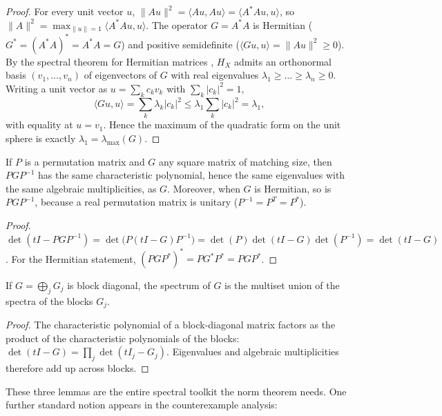 \begin{proof}
For every unit vector $u$,
$\lVert Au\rVert^2=\langle Au,Au\rangle=\langle A^*Au,u\rangle$, so
$\lVert A\rVert^2=\max_{\lVert u\rVert=1}\langle A^*Au,u\rangle$. The
operator $G=A^*A$ is Hermitian ($G^*=(A^*A)^*=A^*A=G$) and positive
semidefinite ($\langle Gu,u\rangle=\lVert Au\rVert^2\ge 0$). By the spectral
theorem for Hermitian matrices \cite{horn}, $H_X$ admits an orthonormal basis
$(v_1,\dots,v_n)$ of eigenvectors of $G$ with real eigenvalues
$\lambda_1\ge\dots\ge\lambda_n\ge 0$. Writing a unit vector as
$u=\sum_k c_k v_k$ with $\sum_k |c_k|^2=1$,
\[
\langle Gu,u\rangle=\sum_k \lambda_k |c_k|^2
\le \lambda_1 \sum_k |c_k|^2 = \lambda_1,
\]
with equality at $u=v_1$. Hence the maximum of the quadratic form on the unit
sphere is exactly $\lambda_1=\lambda_{\max}(G)$.
\end{proof}

\begin{lemma}\label{ch07:lem:similarity}
If $P$ is a permutation matrix and $G$ any square matrix of matching size,
then $PGP^{-1}$ has the same characteristic polynomial, hence the same
eigenvalues with the same algebraic multiplicities, as $G$. Moreover, when
$G$ is Hermitian, so is $PGP^{-1}$, because a real permutation matrix is
unitary ($P^{-1}=P^{T}=P^{*}$).
\end{lemma}

\begin{proof}
$\det(tI-PGP^{-1})=\det\bigl(P(tI-G)P^{-1}\bigr)
=\det(P)\det(tI-G)\det(P^{-1})=\det(tI-G)$. For the Hermitian statement,
$(PGP^{*})^{*}=PG^{*}P^{*}=PGP^{*}$.
\end{proof}

\begin{lemma}\label{ch07:lem:directsum}
If $G=\bigoplus_j G_j$ is block diagonal, the spectrum of $G$ is the
multiset union of the spectra of the blocks $G_j$.
\end{lemma}

\begin{proof}
The characteristic polynomial of a block-diagonal matrix factors as the
product of the characteristic polynomials of the blocks:
$\det(tI-G)=\prod_j\det(tI_j-G_j)$. Eigenvalues and algebraic multiplicities
therefore add up across blocks.
\end{proof}

These three lemmas are the entire spectral toolkit the norm theorem needs.
One further standard notion appears in the counterexample analysis:

